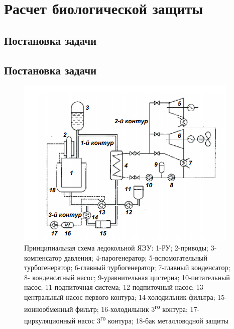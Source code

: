 \chapter{Расчет биологической защиты}
\section{Постановка задачи}

\section{Постановка задачи}

\begin{figure}[!h]
	\center
	\includegraphics{media/image1.png}
	\caption{Принципиальная схема ледокольной ЯЭУ: 1-РУ; 2-приводы;
		3-компенсатор давления; 4-парогенератор; 5-вспомогательный
		турбогенератор; 6-главный турбогенератор; 7-главный конденсатор; 8-
		конденсатный насос; 9-уравнительная цистерна; 10-питательный насос;
		11-подпиточная система; 12-подпиточный насос; 13-центральный насос
		первого контура; 14-холодильник фильтра; 15-ионнообменный фильтр;
		16-холодильник 3\textsuperscript{го} контура; 17-циркуляционный насос
		3\textsuperscript{го} контура; 18-бак металловодной защиты}
\end{figure}

